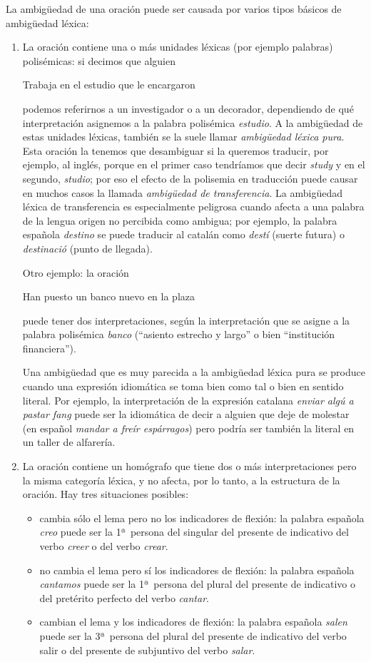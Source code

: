 La ambigüedad de una oración puede ser causada por varios tipos básicos de ambigüedad léxica: \begin{enumerate} \item La oración contiene una o más unidades léxicas (por ejemplo palabras) polisémicas: si decimos que alguien \begin{exemple} Trabaja en el estudio que le encargaron \end{exemple} podemos referirnos a un investigador o a un decorador, dependiendo de qué interpretación asignemos a la palabra polisémica \emph{estudio}. A la ambigüedad de estas unidades léxicas, también se la suele llamar {\em ambigüedad léxica pura}. Esta oración la tenemos que desambiguar si la queremos traducir, por ejemplo, al inglés, porque en el primer caso tendríamos que decir \emph{study} y en el segundo, \emph{studio}; por eso el efecto de la polisemia en traducción puede causar en muchos casos la llamada {\em ambigüedad de transferencia}. La ambigüedad léxica de transferencia es especialmente peligrosa cuando afecta a una palabra de la lengua origen no percibida como ambigua; por ejemplo, la palabra española \emph{destino} se puede traducir al catalán como {\em destí} (suerte futura) o \emph{destinació} (punto de llegada). 

Otro ejemplo: la oración \begin{exemple} Han puesto un banco nuevo en la plaza \end{exemple} puede tener dos interpretaciones, según la interpretación que se asigne a la palabra polisémica \emph{banco} (``asiento estrecho y largo'' o bien ``institución financiera''). 

Una ambigüedad que es muy parecida a la ambigüedad léxica pura se produce cuando una expresión idiomática se toma bien como tal o bien en sentido literal. Por ejemplo, la interpretación de la expresión catalana \emph{enviar algú a pastar fang} puede ser la idiomática de decir a alguien que deje de molestar (en español \emph{mandar a freír espárragos}) pero podría ser también la literal en un taller de alfarería. 

\item La oración contiene un homógrafo que tiene dos o más interpretaciones pero la misma categoría léxica, y no afecta, por lo tanto, a la estructura de la oración. Hay tres situaciones posibles: \begin{itemize} \item cambia sólo el lema pero no los indicadores de flexión: la palabra española \emph{creo} puede ser la 1ª\ persona del singular del presente de indicativo del verbo \emph{creer} o del verbo \emph{crear}. \item no cambia el lema pero sí los indicadores de flexión: la palabra española \emph{cantamos} puede ser la 1ª\ persona del plural del presente de indicativo o del pretérito perfecto del verbo \emph{cantar}. \item cambian el lema y los indicadores de flexión: la palabra española \emph{salen} puede ser la 3ª\ persona del plural del presente de indicativo del verbo salir o del presente de subjuntivo del verbo \emph{salar}. \end{itemize} 


\end{enumerate}
